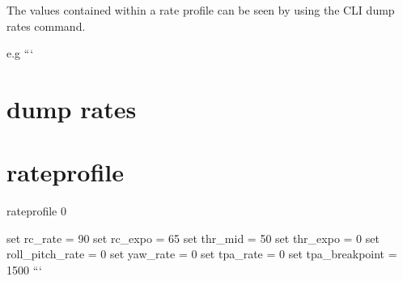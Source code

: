 The values contained within a rate profile can be seen by using the C\+L\+I {\ttfamily dump rates} command.

e.\+g ``` \section*{dump rates}

\section*{rateprofile}

rateprofile 0

set rc\+\_\+rate = 90 set rc\+\_\+expo = 65 set thr\+\_\+mid = 50 set thr\+\_\+expo = 0 set roll\+\_\+pitch\+\_\+rate = 0 set yaw\+\_\+rate = 0 set tpa\+\_\+rate = 0 set tpa\+\_\+breakpoint = 1500 ``` 